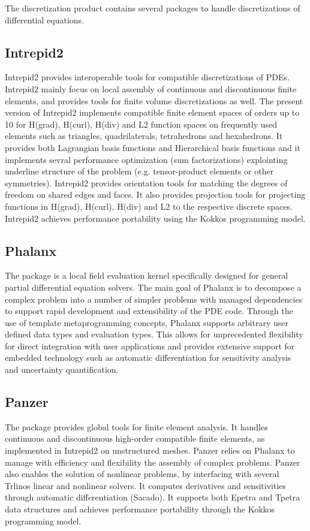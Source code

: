 The discretization product contains several packages to handle discretizations of differential equations.

\subsection{Intrepid2}
Intrepid2 provides interoperable tools for compatible discretizations of PDEs. Intrepid2 mainly focus on local assembly of continuous and discontinuous finite elements, and provides tools for finite volume discretizations as well. The present version of Intrepid2 implements compatible finite element spaces of orders up to 10 for H(grad), H(curl), H(div) and L2 function spaces on frequently used elements such as triangles, quadrilaterals, tetrahedrons and hexahedrons. It provides both Lagrangian basis functions and Hierarchical basis functions and it implements sevral performance optimization (sum factorizations) explointing underline structure of the problem (e.g. tensor-product elements or other symmetries). Intrepid2 provides orientation tools for matching the degrees of freedom on shared edges and faces. It also provides projection tools for projecting functions in H(grad), H(curl), H(div) and L2 to the respective discrete spaces. Intrepid2 achieves performance portability using the Kokkos programming model. 

\subsection{Phalanx}
The package is a local field evaluation kernel specifically designed for general partial differential equation solvers. The main goal of Phalanx is to decompose a complex problem into a number of simpler problems with managed dependencies to support rapid development and extensibility of the PDE code. Through the use of template metaprogramming concepts, Phalanx supports arbitrary user defined data types and evaluation types. This allows for unprecedented flexibility for direct integration with user applications and provides extensive support for embedded technology such as automatic differentiation for sensitivity analysis and uncertainty quantification.

\subsection{Panzer}
The package provides global tools for finite element analysis. It handles continuous and discontinuous high-order compatible finite elements, as implemented in Intrepid2 on unstructured meshes. Panzer relies on Phalanx to manage with efficiency and flexibility the assembly of complex problems. Panzer also enables the solution of nonlinear problems, by interfacing with several Trlinos linear and nonlinear solvers. It computes derivatives and sensitivities through automatic differentiation (Sacado). It supports both Epetra and Tpetra data structures and achieves performance portability through the Kokkos programming model.

